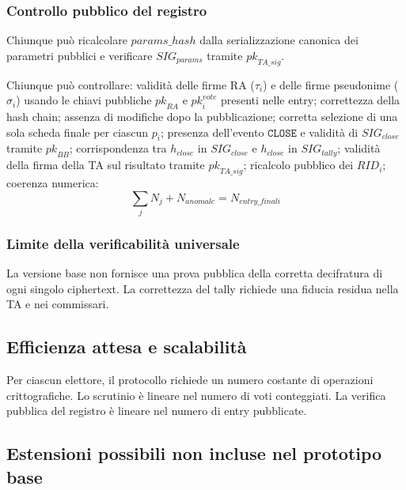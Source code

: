 \documentclass[12pt,a4paper]{article}
\newcommand{\pk}{\mathit{pk}}
\begin{document}
\subsubsection*{Controllo pubblico del registro}

Chiunque pu\`o ricalcolare $\mathit{params\_hash}$ dalla serializzazione canonica dei parametri pubblici e verificare $\mathit{SIG}_{\mathit{params}}$ tramite $\pk_{\mathit{TA\_sig}}$.

Chiunque pu\`o controllare: validit\`a delle firme RA ($\tau_i$) e
delle firme pseudonime ($\sigma_i$) usando le chiavi pubbliche
$\pk_{\mathit{RA}}$ e $\pk_i^{\mathit{vote}}$ presenti nelle entry;
correttezza della hash chain; assenza di modifiche dopo la
pubblicazione; corretta selezione di una sola scheda finale per
ciascun $p_i$; presenza dell'evento $\texttt{CLOSE}$ e validit\`a
di $\mathit{SIG}_{\mathit{close}}$ tramite $\pk_{\mathit{BB}}$;
corrispondenza tra $h_{\mathit{close}}$ in $\mathit{SIG}_{\mathit{close}}$
e $h_{\mathit{close}}$ in $\mathit{SIG}_{\mathit{tally}}$; validit\`a
della firma della TA sul risultato tramite $\pk_{\mathit{TA\_sig}}$;
ricalcolo pubblico dei $\mathit{RID}_i$; coerenza numerica:
\[
\sum_j N_j + N_{\mathit{anomale}} = N_{\mathit{entry\_finali}}
\]

\subsubsection*{Limite della verificabilit\`a universale}

La versione base non fornisce una prova pubblica della corretta decifratura di ogni singolo ciphertext. La correttezza del tally richiede una fiducia residua nella TA e nei commissari.

\subsection{Efficienza attesa e scalabilit\`a}

Per ciascun elettore, il protocollo richiede un numero costante di operazioni crittografiche. Lo scrutinio \`e lineare nel numero di voti conteggiati. La verifica pubblica del registro \`e lineare nel numero di entry pubblicate.

\subsection{Estensioni possibili non incluse nel prototipo base}
\end{document}
